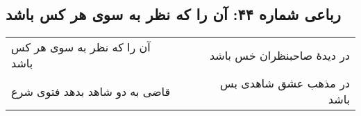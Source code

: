 \begin{center}
\section*{رباعی شماره ۴۴: آن را که نظر به سوی هر کس باشد}
\label{sec:044}
\begin{longtable}{l p{0.5cm} r}
آن را که نظر به سوی هر کس باشد
&&
در دیدهٔ صاحبنظران خس باشد
\\
قاضی به دو شاهد بدهد فتوی شرع
&&
در مذهب عشق شاهدی بس باشد
\\
\end{longtable}
\end{center}
